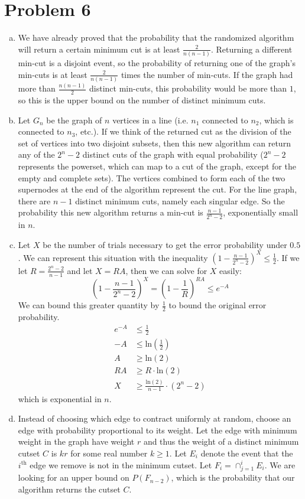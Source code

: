\documentclass[11pt]{article}
\newcommand{\p}[1]{\left(#1\right)}
\renewcommand{\ln}[1]{\text{ln}\p{#1}}
\newcommand{\asdf}{\newline\newline}
\begin{document}
\newpage
\section*{Problem 6}
\begin{enumerate}[(a)]
\item We have already proved that the probability that the randomized algorithm will return a certain minimum cut is at least $\frac2{n(n-1)}$. Returning a different min-cut is a disjoint event, so the probability of returning one of the graph's min-cuts is at least $\frac2{n(n-1)}$ times the number of min-cuts. If the graph had more than $\frac{n(n-1)}2$ distinct min-cuts, this probability would be more than $1$, so this is the upper bound on the number of distinct minimum cuts.
\item Let $G_n$ be the graph of $n$ vertices in a line (i.e. $n_1$ connected to $n_2$, which is connected to $n_3$, etc.). If we think of the returned cut as the division of the set of vertices into two disjoint subsets, then this new algorithm can return any of the $2^n-2$ distinct cuts of the graph with equal probability ($2^n-2$ represents the powerset, which can map to a cut of the graph, except for the empty and complete sets). The vertices combined to form each of the two supernodes at the end of the algorithm represent the cut. For the line graph, there are $n-1$ distinct minimum cuts, namely each singular edge. So the probability this new algorithm returns a min-cut is $\frac{n-1}{2^n-2}$, exponentially small in $n$.
\item Let $X$ be the number of trials necessary to get the error probability under $0.5$. We can represent this situation with the inequality $(1-\frac{n-1}{2^n-2})^X \leq \frac12$. If we let $R=\frac{2^n-2}{n-1}$ and let $X=RA$, then we can solve for $X$ easily:
$$(1-\frac{n-1}{2^n-2})^X = (1-\frac1R)^{RA} \leq e^{-A}$$
We can bound this greater quantity by $\frac12$ to bound the original error probability.
\begin{align*}
e^{-A} &\leq \frac12\\
-A &\leq \ln{\frac12}\\
A &\geq \ln{2}\\
RA &\geq R\cdot \ln{2}\\
X &\geq \frac{\ln{2}}{n-1}\cdot (2^n-2)
\end{align*}
which is exponential in $n$.
\newpage
\item Instead of choosing which edge to contract uniformly at random, choose an edge with probability proportional to its weight. Let the edge with minimum weight in the graph have weight $r$ and thus the weight of a distinct minimum cutset $C$ is $kr$ for some real number $k\geq 1$. Let $E_i$ denote the event that the $i^{\text{th}}$ edge we remove is not in the minimum cutset. Let $F_i = \cap_{j=1}^i E_i$. We are looking for an upper bound on $P(F_{n-2})$, which is the probability that our algorithm returns the cutset $C$.\asdf

\end{enumerate}
\end{document}
